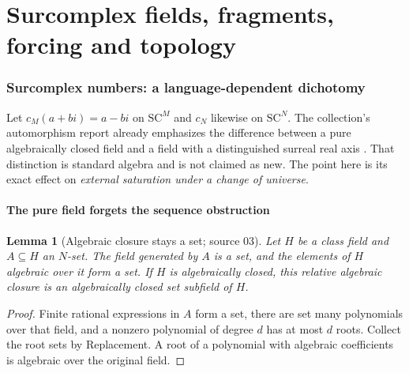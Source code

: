 \documentclass[11pt,letterpaper]{article}
\numberwithin{equation}{section}
\newtheorem{lemma}[lemma]{Lemma}
\theoremstyle{definition}
\theoremstyle{remark}
\newcommand{\SC}{\mathrm{SC}}
\newcommand{\SCM}{\SC^{M}}
\newcommand{\SCN}{\SC^{N}}
\begin{document}
\part{Surcomplex fields, fragments, forcing and topology}\label{univ:part:further}

\section{Surcomplex numbers: a language-dependent dichotomy}\label{univ:sec:complex}

Let $c_M(a+bi)=a-bi$ on $\SCM$ and $c_N$ likewise on $\SCN$. The collection's
automorphism report already emphasizes the difference between a pure
algebraically closed field and a field with a distinguished surreal real axis
\cite{RepoAutomorphisms}. That distinction is standard algebra and is not
claimed as new. The point here is its exact effect on \emph{external
saturation under a change of universe}.

\subsection{The pure field forgets the sequence obstruction}

\begin{lemma}[Algebraic closure stays a set; source 03]\label{univ:lem:algebraicset}
Let $H$ be a class field and $A\subseteq H$ an $N$-set. The field generated by
$A$ is a set, and the elements of $H$ algebraic over it form a set. If $H$ is
algebraically closed, this relative algebraic closure is an algebraically
closed set subfield of $H$.
\end{lemma}
\begin{proof}
Finite rational expressions in $A$ form a set, there are set many polynomials
over that field, and a nonzero polynomial of degree $d$ has at most $d$ roots.
Collect the root sets by Replacement. A root of a polynomial with algebraic
coefficients is algebraic over the original field.
\end{proof}
\end{document}
